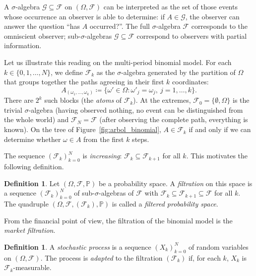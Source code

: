 \documentclass[11pt,a4paper,oneside]{report}
\theoremstyle{plain}
\theoremstyle{definition}
\newtheorem{definicion}[teorema]{Definition}
\theoremstyle{remark}
\newcommand{\PP}{\mathbb{P}}
\newcommand{\F}{\mathcal{F}}
\newcommand{\G}{\mathcal{G}}
\newcommand{\1}{\mathbf{1}}
\newcommand{\eqdef}{\coloneqq}
\begin{document}
A
$\sigma$-algebra $\G \subseteq \F$ on $(\Omega, \F)$ can be
interpreted as the set of those events whose occurrence an observer is
able to determine: if $A \in \G$, the observer can answer the question
``has $A$ occurred?''. The full $\sigma$-algebra $\F$ corresponds to
the omniscient observer; sub-$\sigma$-algebras $\G \subseteq \F$
correspond to observers with partial information.

Let us illustrate this reading on the multi-period binomial model. For
each $k \in \{0, 1, \ldots, N\}$, we define $\F_k$ as the
$\sigma$-algebra generated by the partition of $\Omega$ that groups
together the paths agreeing in their first $k$ coordinates:
\begin{equation*}
  A_{(\omega_1, \ldots, \omega_k)} \eqdef
  \bigl\{\omega' \in \Omega : \omega'_j = \omega_j,\ j = 1, \ldots, k\bigr\}.
\end{equation*}
There are $2^k$ such blocks (the \emph{atoms} of $\F_k$). At the
extremes, $\F_0 = \{\emptyset, \Omega\}$ is the trivial
$\sigma$-algebra (having observed nothing, no event can be
distinguished from the whole world) and $\F_N = \F$ (after observing
the complete path, everything is known). On the tree of
Figure~\ref{fig:arbol_binomial}, $A \in \F_k$ if and only if we can
determine whether $\omega \in A$ from the first $k$ steps.

The sequence $(\F_k)_{k=0}^{N}$ is \emph{increasing}:
$\F_k \subseteq \F_{k+1}$ for all $k$. This motivates the following
definition.

\begin{definicion}
\label{def:filtracion}
Let $(\Omega, \F, \PP)$ be a probability space. A \emph{filtration} on
this space is a sequence $(\F_k)_{k=0}^{N}$ of sub-$\sigma$-algebras
of $\F$ with $\F_k \subseteq \F_{k+1} \subseteq \F$ for all $k$. The
quadruple $(\Omega, \F, (\F_k), \PP)$ is called a \emph{filtered
probability space}.
\end{definicion}

From the financial point of view, the filtration of the binomial model
is the \emph{market filtration}.

\medskip

\begin{definicion}
\label{def:adaptado}
A \emph{stochastic process} is a sequence $(X_k)_{k=0}^{N}$ of random
variables on $(\Omega, \F)$. The process is \emph{adapted} to the
filtration $(\F_k)$ if, for each $k$, $X_k$ is $\F_k$-measurable.
\end{definicion}
\end{document}
